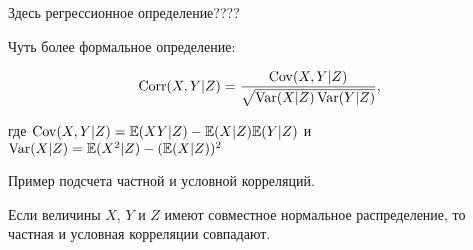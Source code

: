 \documentclass[10pt]{article}
\begin{document}
Здесь регрессионное определение???? 

Чуть более формальное определение:

\begin{definition}
\[
\operatorname{Corr}(X,Y|Z) = \frac{\operatorname{Cov}(X,Y|Z)}{\sqrt{\operatorname{Var}(X|Z)\operatorname{Var}(Y|Z)}},
\]
\end{definition}

где $\operatorname{Cov}(X,Y|Z)=\mathbb{E}(XY|Z)-\mathbb{E}(X|Z)\mathbb{E}(Y|Z)$ и $\operatorname{Var}(X|Z)=\mathbb{E}(X^2|Z)-(\mathbb{E}(X|Z))^2$


Пример подсчета частной и условной корреляций.

\begin{theorem}
Если величины $X$, $Y$ и $Z$ имеют совместное нормальное распределение, то частная и условная корреляции совпадают.
\end{theorem}
\end{document}
